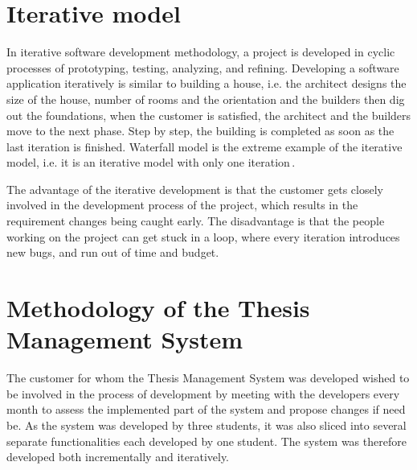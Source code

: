 \section{Iterative model}

In iterative software development methodology, a project is developed in cyclic processes of prototyping, testing, analyzing, and refining. Developing a software application iteratively is similar to building a house, i.e. the architect designs the size of the house, number of rooms and the orientation and the builders then dig out the foundations, when the customer is satisfied, the architect and the builders move to the next phase. Step by step, the building is completed as soon as the last iteration is finished. Waterfall model is the extreme example of the iterative model, i.e. it is an iterative model with only one iteration\,\cite{agile-iterative-development}.

The advantage of the iterative development is that the customer gets closely involved in the development process of the project, which results in the requirement changes being caught early. The disadvantage is that the people working on the project can get stuck in a loop, where every iteration introduces new bugs, and run out of time and budget.

\section{Methodology of the Thesis Management System}

The customer for whom the Thesis Management System was developed wished to be involved in the process of development by meeting with the developers every month to assess the implemented part of the system and propose changes if need be. As the system was developed by three students, it was also sliced into several separate functionalities each developed by one student. The system was therefore developed both incrementally and iteratively.